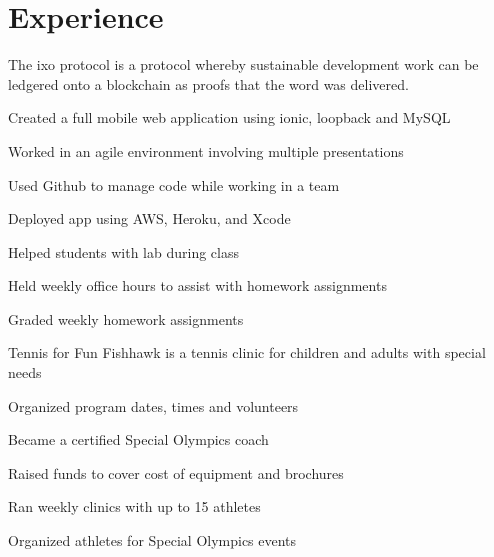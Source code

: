 \documentclass[]{deedy-resume-openfont}
\begin{document}
\begin{minipage}[t]{0.66\textwidth} 


\section{Experience}

\vspace{\topsep} %
\begin{tightemize}\item The ixo protocol is a protocol whereby sustainable development work can be ledgered onto a blockchain as proofs that the word was delivered. 
\end{tightemize}
\sectionsep

\begin{tightemize}
 \item Created a full mobile web application using ionic, loopback and MySQL \item Worked in an agile environment involving multiple presentations \item Used Github to manage code while working in a team \item Deployed app using AWS, Heroku, and Xcode\end{tightemize}
\sectionsep

\begin{tightemize}
\item Helped students with lab during class \item Held weekly office hours to assist with homework assignments \item Graded weekly homework assignments
\end{tightemize}
\sectionsep

\begin{tightemize}
\item 	Tennis for Fun Fishhawk is a tennis clinic for children and adults with special needs\item 	Organized program dates, times and volunteers \item Became a certified Special Olympics coach \item	Raised funds to cover cost of equipment and brochures \item  Ran weekly clinics with up to 15 athletes \item Organized athletes for Special Olympics events  \end{tightemize}
\sectionsep


\end{minipage}
\end{document}
